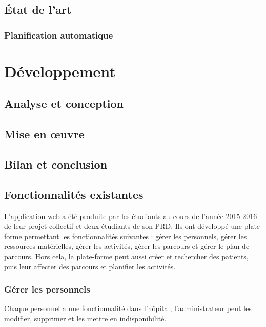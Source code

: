 \documentclass{polytech/polytech}
\begin{document}
\chapter{État de l'art}


\section{Planification automatique}


\part{Développement}


\chapter{Analyse et conception}



\chapter{Mise en œuvre}


\chapter{Bilan et conclusion}


\appendix

\chapter{Fonctionnalités existantes}
\label{ann:foncExist}

L'application web a été produite par les étudiants au cours de l'année 2015-2016 de leur projet collectif et deux étudiants de son PRD. Ils ont développé une plate-forme permettant les fonctionnalités suivantes : gérer les personnels, gérer les ressources matérielles, gérer les activités, gérer les parcours et gérer le plan de parcours. Hors cela, la plate-forme peut aussi créer et rechercher des patients, puis leur affecter des parcours et planifier les activités.


\section{Gérer les personnels}

Chaque personnel a une fonctionnalité dans l'hôpital, l'administrateur peut les modifier, supprimer et les mettre en indisponibilité.
\end{document}
